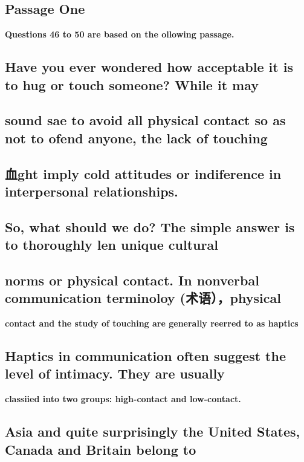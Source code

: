 \documentclass[UTF8,11pt]{ctexart}
\begin{document}
\subsection*{\textbf{Passage One}}


\textbf{Questions 46 to 50 are based on the ollowing passage.}


\subsection*{\textbf{Have you ever wondered how acceptable it is to hug or touch someone? While it may}}


\subsection*{\textbf{sound sae to avoid all physical contact so as not to ofend anyone, the lack of touching}}


\subsection*{\textbf{血ght imply cold attitudes or indiference in interpersonal relationships.}}


\subsection*{\textbf{So, what should we do? The simple answer is to thoroughly len unique cultural}}


\subsection*{\textbf{norms or physical contact. In nonverbal communication terminoloy }(术语），\textbf{physical}}


\textbf{contact and the study of touching are generally reerred to as haptics}


\subsection*{\textbf{Haptics in communication often suggest the level of intimacy. They are usually}}


\textbf{classiied into two groups: high-contact and low-contact.}


\subsection*{\textbf{Asia and quite surprisingly the United States, Canada and Britain belong to}}
\end{document}
